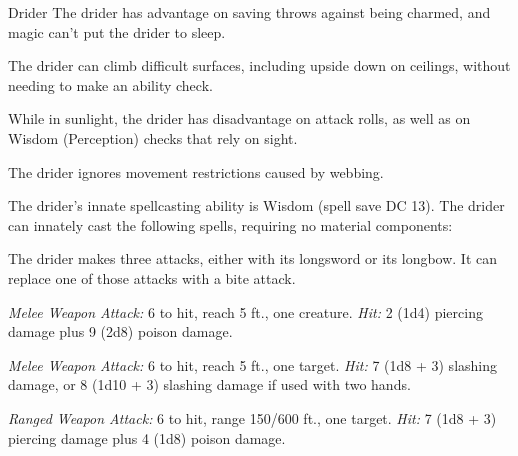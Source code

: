 \documentclass[10pt,a4paper,twoside,bg=print,twocolumn,openany,nodeprecatedcode]{dndbook}
\begin{document}
\begin{DndMonster}[float=t]{Drider}
\DndMonsterBasics[
armor-class = {19 (natural armor)},
hit-points = {\DndDice{13d10 + 52}},
speed = {30 ft., climb 30 ft.}
]
\DndMonsterAbilityScores[
 str = 16,
 dex = 16,
 con = 18,
 int = 13,
 wis = 14,
 cha = 12
]
\DndMonsterDetails[
skills = {Perception +5, Stealth +9},
senses = {darkvision 120 ft., passive perception 15},
languages = {Elvish, Undercommon},
challenge = 6,
]
The drider has advantage on saving throws against being charmed, and magic can't put the drider to sleep.

The drider can climb difficult surfaces, including upside down on ceilings, without needing to make an ability check.

While in sunlight, the drider has disadvantage on attack rolls, as well as on Wisdom (Perception) checks that rely on sight.

The drider ignores movement restrictions caused by webbing.

The drider's innate spellcasting ability is Wisdom (spell save DC 13). The drider can innately cast the following spells, requiring no material components:
\begin{DndMonsterSpells}
\end{DndMonsterSpells}
The drider makes three attacks, either with its longsword or its longbow. It can replace one of those attacks with a bite attack.

\textsl{Melee Weapon Attack:} 6 to hit, reach 5 ft., one creature. \textsl{Hit:} 2 (1d4) piercing damage plus 9 (2d8) poison damage.

\textsl{Melee Weapon Attack:} 6 to hit, reach 5 ft., one target. \textsl{Hit:} 7 (1d8 + 3) slashing damage, or 8 (1d10 + 3) slashing damage if used with two hands.

\textsl{Ranged Weapon Attack:} 6 to hit, range 150/600 ft., one target. \textsl{Hit:} 7 (1d8 + 3) piercing damage plus 4 (1d8) poison damage.

\end{DndMonster}
\end{document}
